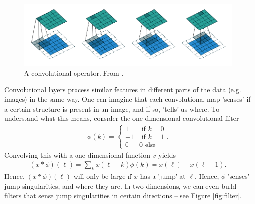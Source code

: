 \documentclass{article}
\begin{document}
\begin{figure}
    \centering
    \includegraphics{graphics/convolutional_layer.png}
    \caption{A convolutional operator. From \cite{dumoulin2016guide}.}
    \label{fig:enter-label}
\end{figure}


Convolutional layers process similar features in different parts of the data (e.g. images) in the same way. One can imagine that each convolutional map 'senses' if a certain structure is present in an image, and if so, 'tells' us where. To understand what this means, consider the one-dimensional convolutional filter
\begin{align*}
    \phi(k) = \begin{cases}
        1 & \text{ if } k = 0 \\
        -1 & \text{ if } k= 1 \\
        0 & 0 \text{ else}
    \end{cases}.
\end{align*}
Convolving this with a one-dimensional function $x$ yields
\begin{align*}
    (x*\phi)(\ell) = \sum_{k}x(\ell-k)\phi(k) = x(\ell)-x(\ell-1).
\end{align*}
Hence, $(x*\phi)(\ell)$ will only be large if $x$ has a 'jump'  at $\ell$. Hence, $\phi$ 'senses' jump singularities, and where they are. In two dimensions, we can even build filters that sense jump singularities in certain directions -- see Figure \ref{fig:filter}.
\end{document}

